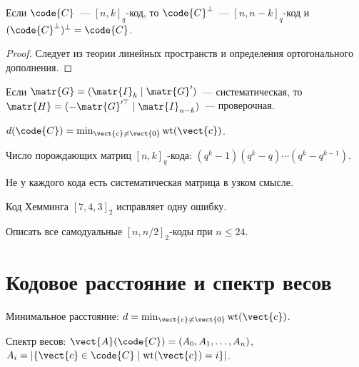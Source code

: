 \documentclass[font=modern]{cmcmsuthesis-phd}
\begin{document}
\begin{theorem}\label{thm:dual-dim}
Если $\code{C}$~--- $[n,k]_q$-код, то $\code{C}^\perp$~---
$[n,n-k]_q$-код и $(\code{C}^\perp)^\perp=\code{C}$.
\end{theorem}

\begin{proof}
Следует из теории линейных пространств и определения
ортогонального дополнения.
\end{proof}

\begin{corollary}\label{cor:parity}
Если $\matr{G}=(\matr{I}_k\mid\matr{G}')$~--- систематическая,
то $\matr{H}=(-\matr{G}'^\top\mid\matr{I}_{n-k})$~--- проверочная.
\end{corollary}

\begin{lemma}\label{lem:weight}
$d(\code{C})=\min_{\vect{c}\neq\vect{0}}\operatorname{wt}(\vect{c})$.
\end{lemma}

\begin{proposition}\label{prop:gen-count}
Число порождающих матриц $[n,k]_q$-кода:
$(q^k-1)(q^k-q)\cdots(q^k-q^{k-1})$.
\end{proposition}

\begin{remark}\label{rem:systematic}
Не у каждого кода есть систематическая матрица в узком смысле.
\end{remark}

\begin{example}\label{ex:hamming}
Код Хемминга $[7,4,3]_2$ исправляет одну ошибку.
\end{example}

\begin{problem}\label{prob:selfdual}
Описать все самодуальные $[n,n/2]_2$-коды при $n\leq 24$.
\end{problem}

\section{Кодовое расстояние и спектр весов}

\begin{definition}\label{def:distance}
Минимальное расстояние: $d=\min_{\vect{c}\neq\vect{0}}\operatorname{wt}(\vect{c})$.
\end{definition}

\begin{definition}\label{def:spectrum}
Спектр весов: $\vect{A}(\code{C})=(A_0,A_1,\ldots,A_n)$,
$A_i=|\{\vect{c}\in\code{C}\mid\operatorname{wt}(\vect{c})=i\}|$.
\end{definition}
\end{document}
